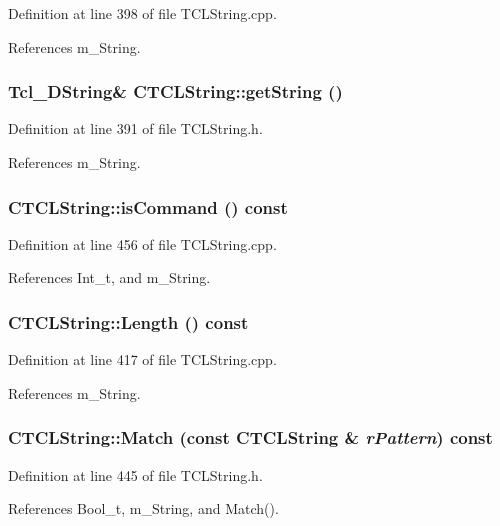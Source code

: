 Definition at line 398 of file TCLString.cpp.

References m\_\-String.
\subsubsection{\setlength{\rightskip}{0pt plus 5cm}Tcl\_\-DString\& CTCLString::get\-String ()\hspace{0.3cm}{\tt  [inline]}}\label{classCTCLString_a13}




Definition at line 391 of file TCLString.h.

References m\_\-String.
\subsubsection{ CTCLString::is\-Command () const}\label{classCTCLString_a27}




Definition at line 456 of file TCLString.cpp.

References Int\_\-t, and m\_\-String.
\subsubsection{ CTCLString::Length () const}\label{classCTCLString_a25}




Definition at line 417 of file TCLString.cpp.

References m\_\-String.
\subsubsection{ CTCLString::Match (const CTCLString \& {\em r\-Pattern}) const\hspace{0.3cm}{\tt  [inline]}}\label{classCTCLString_a30}




Definition at line 445 of file TCLString.h.

References Bool\_\-t, m\_\-String, and Match().
